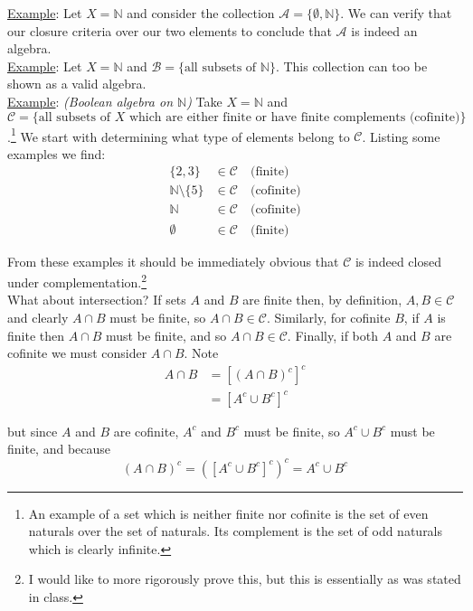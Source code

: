 \documentclass[12pt]{article}
\newlength\tindent
\renewcommand{\indent}{\hspace*{\tindent}}
\newcommand{\N}{\mathbb N}
\begin{document}
\underline{Example}: Let $X = \N$ and consider the collection $\mathcal A = \{\emptyset, \N\}$. We can verify that our closure criteria over our two elements to conclude that $\mathcal A$ is indeed an algebra. \\

\underline{Example}: Let $X = \N$ and $\mathcal B = \{ \text{all subsets of $\N$} \}$. This collection can too be shown as a valid algebra. \\

\underline{Example}: {\em (Boolean algebra on $\N$)} Take $X = \N$ and \newline $\mathcal C = \{ \text{all subsets of $X$ which are either finite or have finite complements (cofinite)} \}$.\footnote{An example of a set which is neither finite nor cofinite is the set of even naturals over the set of naturals. Its complement is the set of odd naturals which is clearly infinite.} We start with determining what type of elements belong to $\mathcal C$. Listing some examples we find:
\begin{align*}
	\{2,3\} &\in \mathcal C \quad \text{(finite)} \\
	\N \setminus \{5\} &\in \mathcal C \quad \text{(cofinite)} \\
	\N &\in \mathcal C \quad \text{(cofinite)} \\
	\emptyset &\in \mathcal C \quad \text{(finite)}
\end{align*}

\indent From these examples it should be immediately obvious that $\mathcal C$ is indeed closed under complementation.\footnote{I would like to more rigorously prove this, but this is essentially as was stated in class.} \\

\indent What about intersection? If sets $A$ and $B$ are finite then, by definition, $A, B \in \mathcal C$ and clearly $A\cap B$ must be finite, so $A \cap B \in \mathcal C$. Similarly, for cofinite $B$, if $A$ is finite then $A\cap B$ must be finite, and so $A \cap B \in \mathcal C$. Finally, if both $A$ and $B$ are cofinite we must consider $A\cap B$. Note
\begin{align*}
	A\cap B &= \left[ \left( A \cap B \right)^c \right]^c \\
		&= \left[ A^c \cup B^c \right]^c
\end{align*}

but since $A$ and $B$ are cofinite, $A^c$ and $B^c$ must be finite, so $A^c \cup B^c$ must be finite, and because
\begin{equation*}
	\left( A \cap B \right)^c = \left( \left[ A^c \cup B^c \right]^c \right)^c = A^c \cup B^c
\end{equation*}
\end{document}
